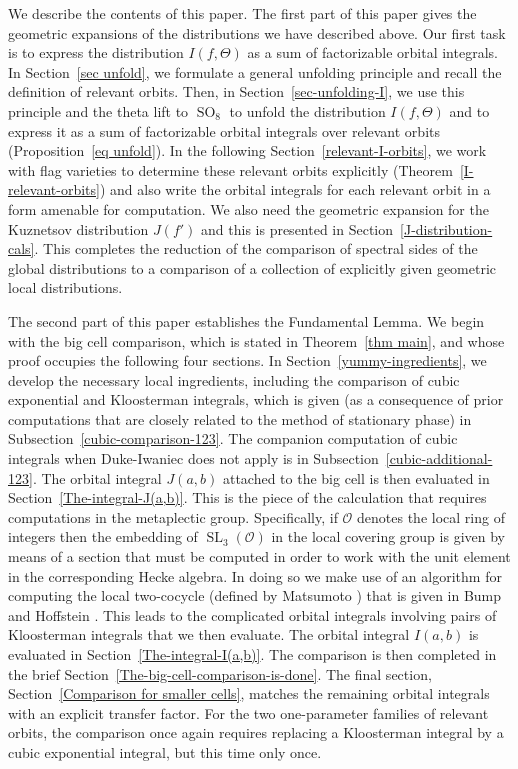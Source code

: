 \documentclass[12pt]{amsart}
\newcommand{\SL}{\operatorname{SL}}
\newcommand{\SO}{\operatorname{SO}}
\renewcommand{\O}{\mathcal{O}}
\theoremstyle{remark}
\begin{document}
We describe the contents of this paper. The first part of this paper gives the geometric expansions of the distributions we have described above.
Our first task is to express the distribution $I(f,\Theta)$ as a sum of factorizable orbital integrals. 
 In Section~\ref{sec unfold}, we formulate a general unfolding principle and recall the definition of relevant orbits. Then,  in Section~\ref{sec-unfolding-I},
 we use this principle and the theta lift to $\SO_8$ to unfold the distribution $I(f,\Theta)$ 
 and to express it
 as a sum of factorizable orbital integrals over relevant orbits  (Proposition~\ref{eq unfold}). In the following Section~\ref{relevant-I-orbits}, we 
 work with flag varieties to
determine these relevant orbits explicitly (Theorem~\ref{I-relevant-orbits}) and also write the orbital integrals for each relevant orbit in a form amenable for computation.  
  We also need the geometric expansion for the Kuznetsov distribution  $J(f')$ and this is presented in Section~\ref{J-distribution-cals}.
  This completes the reduction of the comparison of spectral sides of the global distributions to a comparison of a collection of explicitly given geometric local distributions.

The second part of this paper establishes the Fundamental Lemma.  We begin with the big cell comparison,  which is stated in Theorem~\ref{thm main},
and whose proof occupies the following four sections.  In Section~\ref{yummy-ingredients}, we develop the necessary local ingredients, including the comparison
of cubic exponential and Kloosterman integrals, which is given (as a consequence of prior computations that are closely related to the method
of stationary phase) in Subsection~\ref{cubic-comparison-123}.  The companion computation of cubic integrals when Duke-Iwaniec does not apply 
is in Subsection~\ref{cubic-additional-123}.
The orbital integral $J(a,b)$ attached to the big cell is then evaluated in Section~\ref{The-integral-J(a,b)}.  This is the piece of the calculation that
requires computations in the metaplectic group. Specifically, if $\O$ denotes the local ring of integers then
the embedding of $\SL_3(\O)$ in the local covering group is given by means of a section
that must be computed in order to work with the unit element in the corresponding Hecke algebra. 
In doing so we make use of an algorithm for computing the local two-cocycle (defined by Matsumoto \cite{MR240214})
that is given in
Bump and Hoffstein \cite{MR904946}.  This leads to the complicated orbital integrals involving pairs of Kloosterman
integrals that we then evaluate.  The
orbital integral $I(a,b)$ is evaluated in Section~\ref{The-integral-I(a,b)}.  The comparison is then completed in the brief Section~\ref{The-big-cell-comparison-is-done}.
The final section, Section~\ref{Comparison for smaller cells}, matches the remaining orbital integrals with an explicit transfer factor. For the two one-parameter families
of relevant orbits, the
comparison once again requires replacing a Kloosterman integral by a cubic exponential integral, but this time only once.
\end{document}
